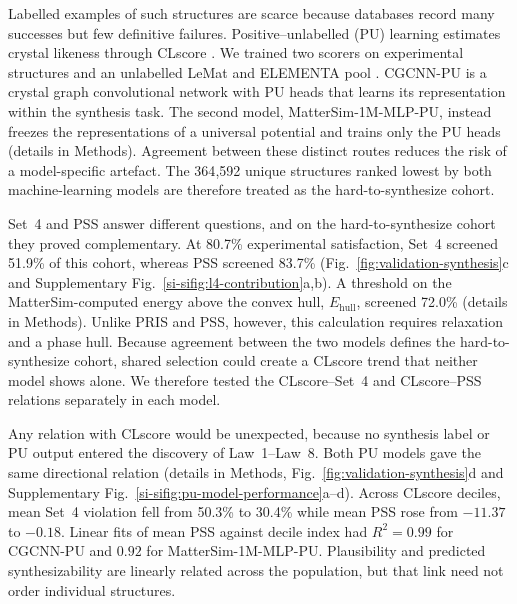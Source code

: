 Labelled examples of such structures are scarce because databases record many successes
but few definitive failures. Positive--unlabelled (PU) learning estimates crystal likeness
through CLscore \cite{jang2020structure,song2025llm}. We trained two scorers on
experimental structures and an unlabelled LeMat and ELEMENTA pool
\cite{ramlaoui2025lemat,elementa2025dataset}. CGCNN-PU is a crystal
graph convolutional network with PU heads that learns its
representation within the synthesis task. The second model, MatterSim-1M-MLP-PU, instead freezes the representations of a universal
potential \cite{yang2024mattersim} and trains only the PU heads (details in Methods).
Agreement between these distinct routes reduces the risk of a model-specific artefact. The
364{,}592 unique structures ranked lowest by both machine-learning models are therefore
treated as the hard-to-synthesize cohort.

Set~4 and PSS answer different questions, and on the hard-to-synthesize cohort they
proved complementary. At 80.7\% experimental
satisfaction, Set~4 screened 51.9\% of this cohort, whereas PSS
screened 83.7\%
(Fig.~\ref{fig:validation-synthesis}c and Supplementary
Fig.~\ref{si-sifig:l4-contribution}a,b). A threshold on the MatterSim-computed energy above the convex hull,
\(E_{\mathrm{hull}}\), screened 72.0\% (details in Methods). Unlike PRIS and
PSS, however, this calculation requires relaxation and a phase hull. Because agreement
between the two models defines the hard-to-synthesize cohort, shared selection could create a CLscore trend
that neither model shows alone. We therefore tested the CLscore--Set~4 and CLscore--PSS
relations separately in each model.

Any relation with CLscore would be unexpected, because no synthesis label or PU output
entered the discovery of Law~1--Law~8. Both PU models gave the same directional relation
(details in Methods, Fig.~\ref{fig:validation-synthesis}d and Supplementary
Fig.~\ref{si-sifig:pu-model-performance}a--d). Across CLscore deciles, mean Set~4 violation
fell from 50.3\% to 30.4\% while mean PSS rose from $-11.37$ to $-0.18$. Linear fits of mean
PSS against decile index had $R^2=0.99$ for CGCNN-PU and $0.92$ for
MatterSim-1M-MLP-PU. Plausibility and predicted
synthesizability are linearly related across the population, but that link need not order
individual structures.

